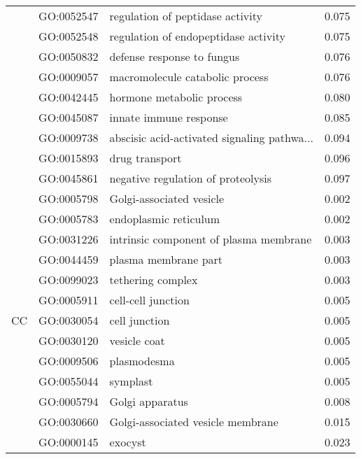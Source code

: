 \begin{longtable}{lllr}
   & GO:0052547 &             regulation of peptidase activity &         0.075 \\
   & GO:0052548 &         regulation of endopeptidase activity &         0.075 \\
   & GO:0050832 &                   defense response to fungus &         0.076 \\
   & GO:0009057 &              macromolecule catabolic process &         0.076 \\
   & GO:0042445 &                    hormone metabolic process &         0.080 \\
   & GO:0045087 &                       innate immune response &         0.085 \\
   & GO:0009738 &  abscisic acid-activated signaling pathwa... &         0.094 \\
   & GO:0015893 &                               drug transport &         0.096 \\
   & GO:0045861 &           negative regulation of proteolysis &         0.097 \\
\cline{1-4}
\multirow{24}{*}{CC} & GO:0005798 &                     Golgi-associated vesicle &         0.002 \\
   & GO:0005783 &                        endoplasmic reticulum &         0.002 \\
   & GO:0031226 &       intrinsic component of plasma membrane &         0.003 \\
   & GO:0044459 &                         plasma membrane part &         0.003 \\
   & GO:0099023 &                            tethering complex &         0.003 \\
   & GO:0005911 &                           cell-cell junction &         0.005 \\
   & GO:0030054 &                                cell junction &         0.005 \\
   & GO:0030120 &                                 vesicle coat &         0.005 \\
   & GO:0009506 &                                  plasmodesma &         0.005 \\
   & GO:0055044 &                                     symplast &         0.005 \\
   & GO:0005794 &                              Golgi apparatus &         0.008 \\
   & GO:0030660 &            Golgi-associated vesicle membrane &         0.015 \\
   & GO:0000145 &                                      exocyst &         0.023 \\

\end{longtable}
